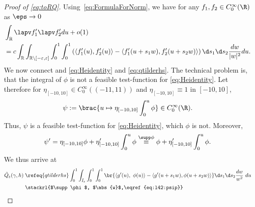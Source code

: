 \begin{proof}[Proof of \eqref{eq:toRQ}]
% 
Using~\eqref{eq:FormulaForNorm}, we have for any $f_1,f_2 \in C_0^\infty(\R)$ as $\eps \to 0$
\begin{equation}\label{eq:Heidentity}
\begin{aligned}
  &\int_{\mathbb R} \lapv f_1' \lapv f_2' du + o(1) \\
 &= c\int_{\mathbb R} \int_{\mathbb R \setminus [-\varepsilon, \varepsilon]} \int_0^1 \int_0^1
  \left(\left\langle f_1'(u), f_2'(u) \right\rangle
 - \left\langle f'_1(u+s_1w), f'_2(u+s_2w) \right\rangle  \right) 
\d s_1\d s_2\frac {dw}{|w|^2} du.
\end{aligned}
\end{equation}
We now connect and \eqref{eq:Heidentity} and \eqref{eq:qtilderhs}. The technical problem is, that the integral of $\phi$ is not a feasible test-function for \eqref{eq:Heidentity}. Let therefore for $\eta_{[-10,10]} \in C_0^\infty ((-11,11))$ and $\eta_{[-10,10]} \equiv 1$ in $[-10,10]$,
\[
 \psi := \brac{u \mapsto \eta_{[-10,10]} \int_0^u \phi} \in C_0^\infty(\R).
\]
Thus, $\psi$ is a feasible test-function for \eqref{eq:Heidentity}, which $\phi$ is not. Moreover,
\begin{equation}\label{eq:l42:psip}
 \psi' = \eta_{[-10,10]} \phi + \eta'_{[-10,10]} \int_0^u \phi \overset{\supp \phi}{\equiv } \phi + \eta'_{[-10,10]} \int_0^u \phi.
\end{equation}
We thus arrive at
\begin{align*}
 \tilde{Q}_\varepsilon(\gamma,h) \;
 &\refeq{qtilderhs}
 \int_{0}^{1}\int_{\tilde I_\varepsilon} \int_0^1 \int_0^1
  \br{\left\langle g'(u),\ \phi(u) \right\rangle - \left\langle g'(u+s_1w), \phi(u+s_2w)
  \right\rangle} \d s_1\d s_2\frac{dw}{w^2}\ du\\
 &\stackrl{$\supp \phi$, $\abs{w}$,\eqref{eq:l42:psip}}\qquad

\end{align*}
\end{proof}
